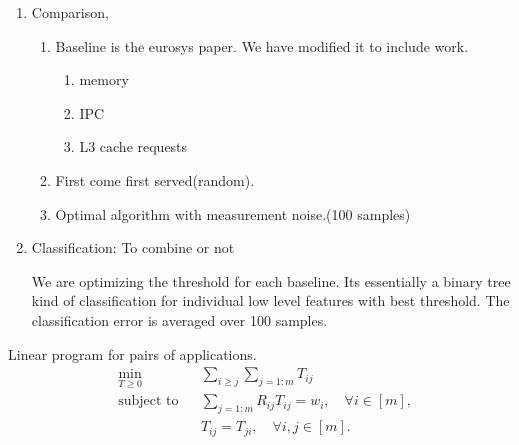 \begin{enumerate}
\item Comparison,
\begin{enumerate}
\item Baseline is the eurosys paper. We have modified it to include work.
\begin{enumerate}
\item memory
\item IPC
\item L3 cache requests
\end{enumerate}
\item First come first served(random).

\item Optimal algorithm with measurement noise.(100 samples)
\end{enumerate}

\item Classification: To combine or not


We are optimizing the threshold for each baseline. Its essentially a binary tree kind of classification for individual low level features with best threshold. The classification error is averaged over 100 samples.
\end{enumerate}

Linear program for pairs of applications.
\begin{equation}
\begin{aligned}
\label{eq:pairschedule}
&   \underset{T \geq 0}{\text{min}}  
&&   \sum_{i \geq j} \sum_{j=1:m} T_{ij} \\
&   \text{subject to} &&  \sum_{j=1:m} R_{ij} T_{ij} = w_i, \quad  \forall i\in [m],\\
&&&	  T_{ij} = T_{ji}, \quad \forall i,j \in [m].\\
\end{aligned}
\end{equation}

